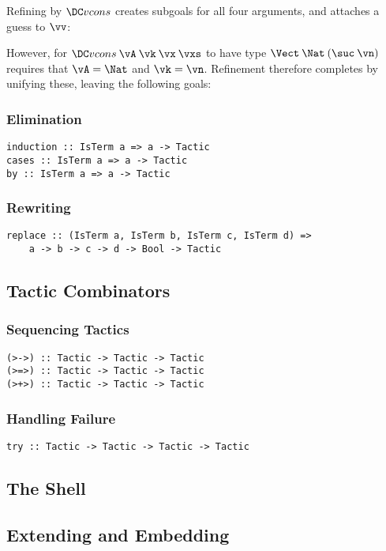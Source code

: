 Refining by $\Vcons$ creates subgoals for all four arguments, and
attaches a guess to $\vv$:
\DM{
\AR{
\hole{\vA}{\Type}\\
\hole{\vk}{\Nat}\\
\hole{\vx}{\vA}\\
\hole{\vxs}{\Vect\:\vA\:\vk}\\
\guess{\vv}{\Vect\:\Nat\:(\suc\:\vn)}{\Vcons\:\vA\:\vk\:\vx\:\vxs}
}
}

However, for $\Vcons\:\vA\:\vk\:\vx\:\vxs$ to have type
$\Vect\:\Nat\:(\suc\:\vn)$ requires that $\vA=\Nat$ and $\vk=\vn$.
Refinement therefore completes by unifying these, leaving the
following goals:
\DM{
\AR{
\hole{\vx}{\Nat}\\
\hole{\vxs}{\Vect\:\Nat\:\vn}\\
\guess{\vv}{\Vect\:\Nat\:(\suc\:\vn)}{\Vcons\:\Nat\:\vn\:\vx\:\vxs}
}
}

\subsubsection{Elimination}

\begin{verbatim}
induction :: IsTerm a => a -> Tactic
cases :: IsTerm a => a -> Tactic
by :: IsTerm a => a -> Tactic
\end{verbatim}

\subsubsection{Rewriting}

\begin{verbatim}
replace :: (IsTerm a, IsTerm b, IsTerm c, IsTerm d) =>
    a -> b -> c -> d -> Bool -> Tactic
\end{verbatim}

\subsection{Tactic Combinators}

\subsubsection{Sequencing Tactics}

\begin{verbatim}
(>->) :: Tactic -> Tactic -> Tactic
(>=>) :: Tactic -> Tactic -> Tactic
(>+>) :: Tactic -> Tactic -> Tactic
\end{verbatim}

\subsubsection{Handling Failure}

\begin{verbatim}
try :: Tactic -> Tactic -> Tactic -> Tactic
\end{verbatim}

\subsection{The Shell}

\subsection{Extending and Embedding}
